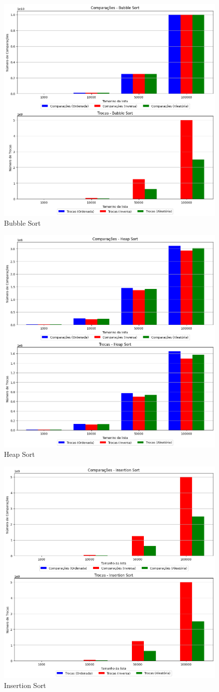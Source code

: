 \documentclass[tcc1,project]{uftex}
\begin{document}
\setcounter{figure}{0} %

\begin{figure}[!h]
    \centering
    \includegraphics[width=0.5\linewidth]{graficos/grafico_Bubble Sort_comparisons_swaps.png}
    \caption{Bubble Sort}
    \label{fig:bubble-sort}
\end{figure}

\begin{figure}[!h]
    \centering
    \includegraphics[width=0.5\linewidth]{graficos/grafico_Heap Sort_comparisons_swaps.png}
    \caption{Heap Sort}
    \label{fig:heap-sort}
\end{figure}

\begin{figure}[!h]
    \centering
    \includegraphics[width=0.5\linewidth]{graficos/grafico_Insertion Sort_comparisons_swaps.png}
    \caption{Insertion Sort}
    \label{fig:insertion-sort}
\end{figure}
\end{document}
